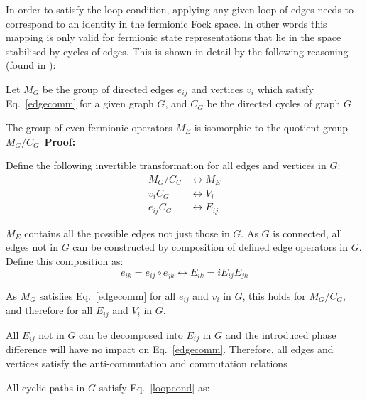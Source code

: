 \documentclass[twoside]{article}
\begin{document}
In order to satisfy the loop condition, applying any given loop of edges needs to correspond to an identity in the fermionic Fock space. In other words this mapping is only valid for fermionic state representations that lie in the space stabilised by cycles of edges. This is shown in detail by the following reasoning (found in \cite{derbyklassen2}):
\begin{romanlist}
\item Let $M_G$ be the group of directed edges $e_{ij}$ and vertices $v_{i}$ which satisfy Eq.~\ref{edgecomm} for a given graph $G$, and $C_G$ be the directed cycles of graph $G$
\item The group of even fermionic operators $M_E$ is isomorphic to the quotient group $M_G/C_G$\  \textbf{Proof:}
        \begin{alphlist}
        \item Define the following invertible transformation for all edges and vertices in $G$:
                \begin{equation}
                        \begin{align}
                                M_G/C_G &\longleftrightarrow M_E\\
                                v_i C_G &\longleftrightarrow V_i\\
                         e_{ij}C_G &\longleftrightarrow E_{ij}
                        \end{align}
                \end{equation}
        \item $M_E$ contains all the possible edges not just those in $G$. As $G$ is connected, all edges not in $G$ can be constructed by composition of defined edge operators in $G$. Define this composition as:
                \begin{equation}
                        e_{ik} = e_{ij} \circ e_{jk} \longleftrightarrow E_{ik} = i E_{ij} E_{jk}
                \end{equation}
        \item As $M_G$ satisfies Eq.~\ref{edgecomm} for all $e_{ij}$ and $v_i$ in $G$, this holds for $M_G/C_G$, and therefore for all $E_{ij}$ and $V_{i}$ in $G$.
        \item All $E_{ij}$ not in $G$ can be decomposed into $E_{ij}$ in $G$ and the introduced phase difference will have no impact on Eq.~\ref{edgecomm}. Therefore, all edges and vertices satisfy the anti-commutation and commutation relations
        \item All cyclic paths in $G$ satisfy Eq.~\ref{loopcond} as:

\end{alphlist}
\end{romanlist}
\end{document}
